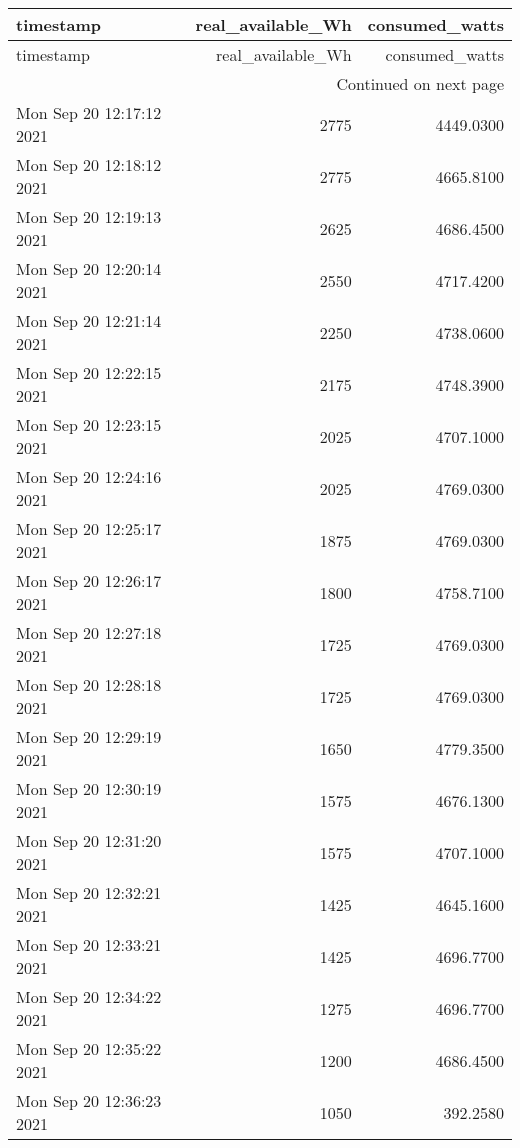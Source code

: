\begin{longtable}{lrr}
\toprule
               timestamp &  real\_available\_Wh &  consumed\_watts \\
\midrule
\endfirsthead

\toprule
               timestamp &  real\_available\_Wh &  consumed\_watts \\
\midrule
\endhead
\midrule
\multicolumn{3}{r}{{Continued on next page}} \\
\midrule
\endfoot

\bottomrule
\endlastfoot
Mon Sep 20 12:17:12 2021 &               2775 &       4449.0300 \\
Mon Sep 20 12:18:12 2021 &               2775 &       4665.8100 \\
Mon Sep 20 12:19:13 2021 &               2625 &       4686.4500 \\
Mon Sep 20 12:20:14 2021 &               2550 &       4717.4200 \\
Mon Sep 20 12:21:14 2021 &               2250 &       4738.0600 \\
Mon Sep 20 12:22:15 2021 &               2175 &       4748.3900 \\
Mon Sep 20 12:23:15 2021 &               2025 &       4707.1000 \\
Mon Sep 20 12:24:16 2021 &               2025 &       4769.0300 \\
Mon Sep 20 12:25:17 2021 &               1875 &       4769.0300 \\
Mon Sep 20 12:26:17 2021 &               1800 &       4758.7100 \\
Mon Sep 20 12:27:18 2021 &               1725 &       4769.0300 \\
Mon Sep 20 12:28:18 2021 &               1725 &       4769.0300 \\
Mon Sep 20 12:29:19 2021 &               1650 &       4779.3500 \\
Mon Sep 20 12:30:19 2021 &               1575 &       4676.1300 \\
Mon Sep 20 12:31:20 2021 &               1575 &       4707.1000 \\
Mon Sep 20 12:32:21 2021 &               1425 &       4645.1600 \\
Mon Sep 20 12:33:21 2021 &               1425 &       4696.7700 \\
Mon Sep 20 12:34:22 2021 &               1275 &       4696.7700 \\
Mon Sep 20 12:35:22 2021 &               1200 &       4686.4500 \\
Mon Sep 20 12:36:23 2021 &               1050 &        392.2580 \\

\end{longtable}
